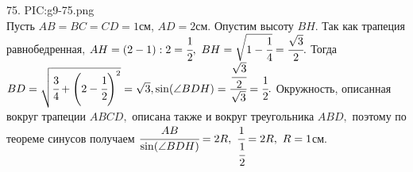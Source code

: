 75. {{PIC:g9-75.png}}\\
Пусть $AB=BC=CD=1$см, $AD=2$см. Опустим высоту $BH.$ Так как трапеция равнобедренная, $AH=(2-1):2=\cfrac{1}{2},\ BH=\sqrt{1-\cfrac{1}{4}}=\cfrac{\sqrt{3}}{2}.$ Тогда $BD=\sqrt{\cfrac{3}{4}+\left(2-\cfrac{1}{2}\right)^2}=\sqrt{3}, \sin(\angle BDH)=\cfrac{\cfrac{\sqrt{3}}{2}}{\sqrt{3}}=\cfrac{1}{2}.$ Окружность, описанная вокруг трапеции $ABCD,$ описана также и вокруг треугольника $ABD,$ поэтому по теореме синусов получаем $\cfrac{AB}{\sin(\angle BDH)}=2R,\ \cfrac{1}{\cfrac{1}{2}}=2R,\ R=1$см.\\
